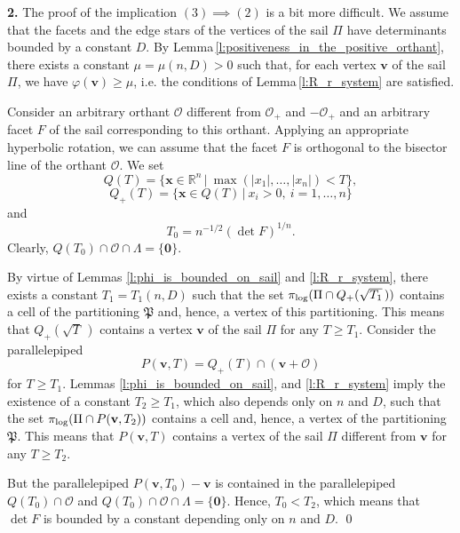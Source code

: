 \documentclass[11pt]{article}
\theoremstyle{definition}
\theoremstyle{remark}
\theoremstyle{plain}
\renewcommand{\vec}[1]{\mathbf{#1}}
\renewcommand{\geq}{\geqslant}
\newcommand{\sail}{\Pi}
\newcommand{\La}{\Lambda}
\newcommand{\R}{\mathbb{R}}
\newcommand{\pilog}{\pi_{\textup{log}}}
\newcommand{\partition}{\mathfrak P}
\begin{document}
  {\bf 2.}
  The proof of the implication $(3)\implies (2)$ is a bit more difficult. We assume that the
  facets and the edge stars of the vertices of the sail $\sail$ have determinants bounded by
  a constant $D$. By Lemma\,\ref{l:positiveness_in_the_positive_orthant}, there exists a
  constant $\mu=\mu(n,D)>0$ such that, for each vertex $\vec v$ of the sail $\sail$, we have
  $ \varphi(\vec v)\geq\mu$, i.e. the conditions of Lemma\,\ref{l:R_r_system} are satisfied.

  Consider an arbitrary orthant $\mathcal O$ different from $\mathcal O_+$ and
  $-\mathcal O_+$ and an arbitrary facet $F$ of the sail corresponding to this orthant.
  Applying an appropriate hyperbolic rotation, we can assume that the facet $F$ is orthogonal
  to the bisector line of the orthant $\mathcal O$. We set
  \[ Q(T)=\big\{ \vec x\in\R^n\, \big|\ \max(|x_1|,\ldots,|x_n|)<T \big\}, \]
  \[ Q_+(T)=\big\{ \vec x\in Q(T)\, \big|\ x_i>0,\ i=1,\ldots,n \big\} \]
  and
  \[ T_0=n^{-1/2}(\det F)^{1/n}. \]
  Clearly, $Q(T_0)\cap\mathcal O\cap\La=\{\vec 0\}$.

  By virtue of Lemmas \ref{l:phi_is_bounded_on_sail} and \ref{l:R_r_system}, there exists a
  constant $T_1=T_1(n,D)$ such that the set $\pilog(\sail\cap Q_+(\sqrt{T_1}\,))$ contains a
  cell of the partitioning $\partition$ and, hence, a vertex of this partitioning. This means
  that $Q_+(\sqrt{T}\,)$ contains a vertex $\vec v$ of the sail $\sail$ for any $T\geq T_1$.
  Consider the parallelepiped
  \[ P(\vec v,T)=Q_+(T)\cap(\vec v+\mathcal O) \]
  for $T\geq T_1$. Lemmas \ref{l:phi_is_bounded_on_sail}, and \ref{l:R_r_system} imply the
  existence of a constant $T_2\geq T_1$, which also depends only on $n$ and $D$, such that
  the set $\pilog(\sail\cap P(\vec v,T_2))$ contains a cell and, hence, a vertex of the
  partitioning $\partition$. This means that $P(\vec v,T)$ contains a vertex of the sail
  $\sail$ different from $\vec v$ for any $T\geq T_2$.

  But the parallelepiped $P(\vec v,T_0)-\vec v$ is contained in the parallelepiped
  $Q(T_0)\cap\mathcal O$ and $Q(T_0)\cap\mathcal O\cap\La=\{\vec 0\}$. Hence, $T_0<T_2$,
  which means that $\det F$ is bounded by a constant depending only on $n$ and $D$.
  \qed
\end{document}
